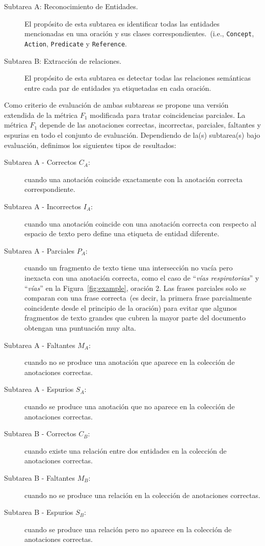 \begin{description}
    \item[Subtarea A: Reconocimiento de Entidades.]
    El propósito de esta subtarea es identificar todas las entidades mencionadas en una oración y sus clases correspondientes.~(i.e., \texttt{Concept}, \texttt{Action}, \texttt{Predicate} y \texttt{Reference}.

    \item[Subtarea B: Extracción de relaciones.]
    El propósito de esta subtarea es detectar todas las relaciones semánticas entre cada par de entidades ya etiquetadas en cada oración.
\end{description}

Como criterio de evaluación de ambas subtareas se propone una versión extendida de la métrica $F_1$ modificada para tratar coincidencias parciales. La métrica $F_1$ depende de las anotaciones correctas, incorrectas, parciales, faltantes y espurias en todo el conjunto de evaluación. Dependiendo de la(s) subtarea(s) bajo evaluación, definimos los siguientes tipos de resultados:

\begin{description}
\item[Subtarea A - Correctos $C_A$:] cuando una anotación coincide exactamente con la anotación correcta correspondiente.
\item[Subtarea A - Incorrectos $I_A$:] cuando una anotación coincide con una anotación correcta con respecto al espacio de texto pero define una etiqueta de entidad diferente.
\item[Subtarea A - Parciales $P_A$:] cuando un fragmento de texto tiene una intersección no vacía pero inexacta con una anotación correcta, como el caso de ``\textit{vías respiratorias}'' y ``\textit{vías}'' en la Figura~\ref{fig:example}, oración 2.
Las frases parciales solo se comparan con una frase correcta~(es decir, la primera frase parcialmente coincidente desde el principio de la oración) para evitar que algunos fragmentos de texto grandes que cubren la mayor parte del documento obtengan una puntuación muy alta.
\item [Subtarea A - Faltantes $M_A$:] cuando no se produce una anotación que aparece en la colección de anotaciones correctas.
\item [Subtarea A - Espurios $S_A$:] cuando se produce una anotación que no aparece en la colección de anotaciones correctas.
\end{description}

\begin{description}
\item[Subtarea B - Correctos $C_B$:] cuando existe una relación entre dos entidades en la colección de anotaciones correctas.
\item[Subtarea B - Faltantes $M_B$:] cuando no se produce una relación en la colección de anotaciones correctas.
\item[Subtarea B - Espurios $S_B$:] cuando se produce una relación pero no aparece en la colección de anotaciones correctas.
\end{description}

